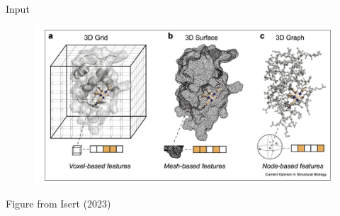 \documentclass{beamer}
\begin{document}
\fi 





\begin{frame}{Input}
    \begin{figure}
        \centering 
        \includegraphics[scale=0.55]{Isert_2023_ModelsSBDD.png}
    \end{figure}
    Figure from Isert (2023) \cite{isert_structure-based_2023}
\end{frame}
\end{document}
